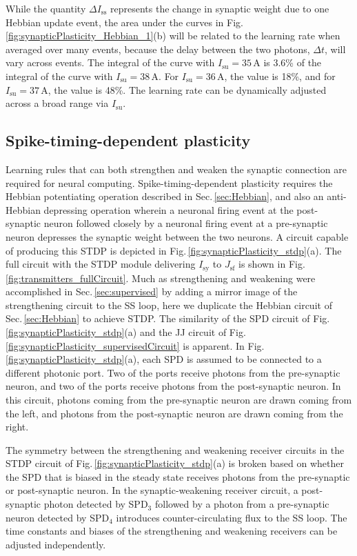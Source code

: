 \documentclass[aip,amsmath,amssymb,reprint,nofootinbib]{revtex4-1}
\begin{document}
While the quantity $\Delta I_{\mathrm{ss}}$ represents the change in synaptic weight due to one Hebbian update event, the area under the curves in Fig.\,\ref{fig:synapticPlasticity_Hebbian_1}(b) will be related to the learning rate when averaged over many events, because the delay between the two photons, $\Delta t$, will vary across events. The integral of the curve with $I_{\mathrm{su}} = 35$\,\textmu A is 3.6\% of the integral of the curve with $I_{\mathrm{su}} = 38$\,\textmu A. For $I_{\mathrm{su}} = 36$\,\textmu A, the value is 18\%, and for $I_{\mathrm{su}} = 37$\,\textmu A, the value is 48\%. The learning rate can be dynamically adjusted across a broad range via $I_{\mathrm{su}}$.
	
\subsection{\label{sec:stdp}Spike-timing-dependent plasticity}
Learning rules that can both strengthen and weaken the synaptic connection are required for neural computing. Spike-timing-dependent plasticity requires the Hebbian potentiating operation described in Sec.\,\ref{sec:Hebbian}, and also an anti-Hebbian depressing operation wherein a neuronal firing event at the post-synaptic neuron followed closely by a neuronal firing event at a pre-synaptic neuron depresses the synaptic weight between the two neurons. A circuit capable of producing this STDP is depicted in Fig.\,\ref{fig:synapticPlasticity_stdp}(a). The full circuit with the STDP module delivering $I_{\mathrm{sy}}$ to $J_{\mathrm{sf}}$ is shown in Fig.\,\ref{fig:transmitters_fullCircuit}. Much as strengthening and weakening were accomplished in Sec.\,\ref{sec:supervised} by adding a mirror image of the strengthening circuit to the SS loop, here we duplicate the Hebbian circuit of Sec.\,\ref{sec:Hebbian} to achieve STDP. The similarity of the SPD circuit of Fig.\,\ref{fig:synapticPlasticity_stdp}(a) and the JJ circuit of Fig.\,\ref{fig:synapticPlasticity_supervisedCircuit} is apparent. In Fig.\,\ref{fig:synapticPlasticity_stdp}(a), each SPD is assumed to be connected to a different photonic port. Two of the ports receive photons from the pre-synaptic neuron, and two of the ports receive photons from the post-synaptic neuron. In this circuit, photons coming from the pre-synaptic neuron are drawn coming from the left, and photons from the post-synaptic neuron are drawn coming from the right. 

The symmetry between the strengthening and weakening receiver circuits in the STDP circuit of Fig.\,\ref{fig:synapticPlasticity_stdp}(a) is broken based on whether the SPD that is biased in the steady state receives photons from the pre-synaptic or post-synaptic neuron. In the synaptic-weakening receiver circuit, a post-synaptic photon detected by SPD$_3$ followed by a photon from a pre-synaptic neuron detected by SPD$_4$ introduces counter-circulating flux to the SS loop. The time constants and biases of the strengthening and weakening receivers can be adjusted independently.   
\end{document}
